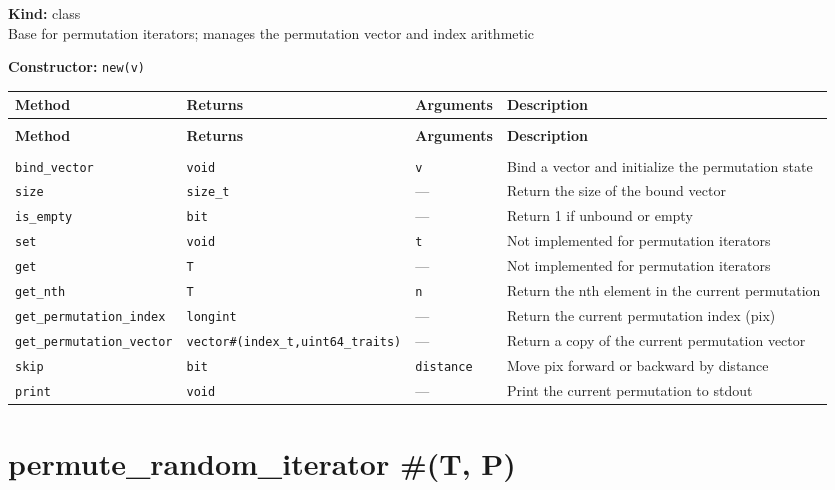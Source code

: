 \documentclass[11pt,letterpaper]{report}
\begin{document}
\noindent\textbf{Kind:} class\\
\noindent Base for permutation iterators; manages the permutation vector and index arithmetic

\noindent\textbf{Constructor:} \texttt{new(v)}

\begin{xltabular}{\linewidth}{>{\small}p{1.35in} >{\small}p{1.25in} >{\small}p{0.95in} >{\small}X}
\toprule
\textbf{Method} & \textbf{Returns} & \textbf{Arguments} & \textbf{Description} \\
\midrule
\endfirsthead
{} \\
\midrule
\textbf{Method} & \textbf{Returns} & \textbf{Arguments} & \textbf{Description} \\
\midrule
\endhead
\midrule
{} \\
\endfoot
\bottomrule
\endlastfoot
\texttt{bind\_vector} & \texttt{void} & \texttt{v} & Bind a vector and initialize the permutation state \\
\texttt{size} & \texttt{size\_t} & --- & Return the size of the bound vector \\
\texttt{is\_empty} & \texttt{bit} & --- & Return 1 if unbound or empty \\
\texttt{set} & \texttt{void} & \texttt{t} & Not implemented for permutation iterators \\
\texttt{get} & \texttt{T} & --- & Not implemented for permutation iterators \\
\texttt{get\_nth} & \texttt{T} & \texttt{n} & Return the nth element in the current permutation \\
\texttt{get\_permutation\_index} & \texttt{longint} & --- & Return the current permutation index (pix) \\
\texttt{get\_permutation\_vector} & \texttt{vector\#(index\_t,uint64\_traits)} & --- & Return a copy of the current permutation vector \\
\texttt{skip} & \texttt{bit} & \texttt{distance} & Move pix forward or backward by distance \\
\texttt{print} & \texttt{void} & --- & Print the current permutation to stdout \\
\end{xltabular}

\section{permute\_random\_iterator \#(T, P)}
\label{cls:permuterandomiteratorTP}
\end{document}
